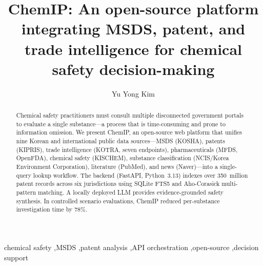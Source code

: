 \documentclass[preprint,12pt]{elsarticle}
\begin{document}
\begin{frontmatter}

\title{ChemIP: An open-source platform integrating MSDS, patent, and trade intelligence for chemical safety decision-making}

\author[inst1]{Yu Yong Kim}


\begin{abstract}
Chemical safety practitioners must consult multiple disconnected government portals to evaluate a single substance---a process that is time-consuming and prone to information omission.
We present ChemIP, an open-source web platform that unifies nine Korean and international public data sources---MSDS (KOSHA), patents (KIPRIS), trade intelligence (KOTRA, seven endpoints), pharmaceuticals (MFDS, OpenFDA), chemical safety (KISCHEM), substance classification (NCIS/Korea Environment Corporation), literature (PubMed), and news (Naver)---into a single-query lookup workflow.
The backend (FastAPI, Python~3.13) indexes over 350~million patent records across six jurisdictions using SQLite FTS5 and Aho-Corasick multi-pattern matching.
A locally deployed LLM provides evidence-grounded safety synthesis.
In controlled scenario evaluations, ChemIP reduced per-substance investigation time by 78\%.
\end{abstract}

\begin{keyword}
chemical safety \sep MSDS \sep patent analysis \sep API orchestration \sep open-source \sep decision support
\end{keyword}

\end{frontmatter}

\end{document}
